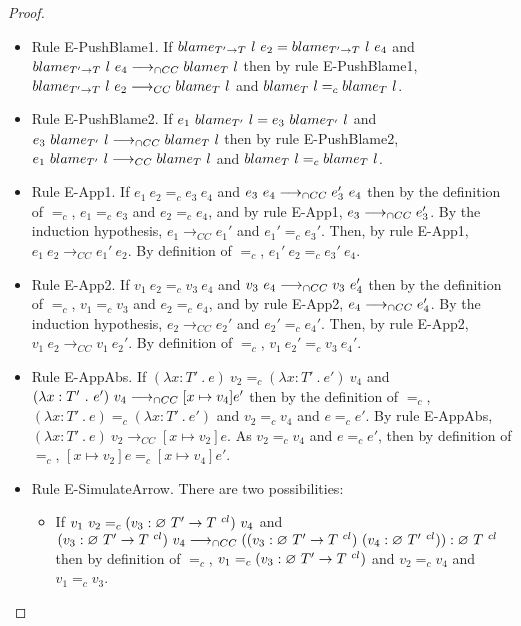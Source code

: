 \documentclass[a4paper]{article}
\begin{document}
\begin{proof}
\begin{itemize}
\begin{itemize}
        \item Rule E-PushBlame1.
        If $blame_{T' \rightarrow T}\ l\ e_2 = blame_{T' \rightarrow T}\ l\ e_4$ and $blame_{T' \rightarrow T}\ l\ e_4 \longrightarrow_{\cap CC} blame_{T}\ l$ then by rule E-PushBlame1, $blame_{T' \rightarrow T}\ l\ e_2 \longrightarrow_{CC} blame_{T}\ l$ and $blame_{T}\ l =_c blame_{T}\ l$.
        \item Rule E-PushBlame2.
        If $e_1\ \blame{T'}{l} = e_3\ \blame{T'}{l}$ and $e_3\ blame_{T'}\ l \longrightarrow_{\cap CC} blame_{T}\ l$ then by rule E-PushBlame2, $e_1\ blame_{T'}\ l \longrightarrow_{CC} blame_{T}\ l$ and $blame_{T}\ l =_c blame_{T}\ l$.
        \item Rule E-App1.
        If $e_1\ e_2 =_c e_3\ e_4$ and $e_3\ e_4 \longrightarrow_{\cap CC} e_3'\ e_4$ then by the definition of $=_c$, $e_1 =_c e_3$ and $e_2 =_c e_4$, and by rule E-App1, $e_3 \longrightarrow_{\cap CC} e_3'$.
        By the induction hypothesis, $e_1 \longrightarrow_{CC} e_1'$ and $e_1' =_c e_3'$.
        Then, by rule E-App1, $e_1\ e_2 \longrightarrow_{CC} e_1'\ e_2$.
        By definition of $=_c$, $e_1'\ e_2 =_c e_3'\ e_4$.
        \item Rule E-App2.
        If $v_1\ e_2 =_c v_3\ e_4$ and $v_3\ e_4 \longrightarrow_{\cap CC} v_3\ e_4'$ then by the definition of $=_c$, $v_1 =_c v_3$ and $e_2 =_c e_4$, and by rule E-App2, $e_4 \longrightarrow_{\cap CC} e_4'$.
        By the induction hypothesis, $e_2 \longrightarrow_{CC} e_2'$ and $e_2' =_c e_4'$.
        Then, by rule E-App2, $v_1\ e_2 \longrightarrow_{CC} v_1\ e_2'$.
        By definition of $=_c$, $v_1\ e_2' =_c v_3\ e_4'$.
        \item Rule E-AppAbs.
        If $(\lambda x : T'\ .\ e)\ v_2 =_c (\lambda x : T'\ .\ e')\ v_4$ and $(\lambda x : T'\ .\ e')\ v_4 \longrightarrow_{\cap CC} [x \mapsto v_4]e'$ then by the definition of $=_c$, $(\lambda x : T'\ .\ e) =_c (\lambda x : T'\ .\ e')$ and $v_2 =_c v_4$ and $e =_c e'$.
        By rule E-AppAbs, $(\lambda x : T'\ .\ e)\ v_2 \longrightarrow_{CC} [x \mapsto v_2]e$.
        As $v_2 =_c v_4$ and $e =_c e'$, then by definition of $=_c$, $[x \mapsto v_2]e =_c [x \mapsto v_4]e'$.
        \item Rule E-SimulateArrow.
        There are two possibilities:
        \begin{itemize}
            \item If $v_1\ v_2 =_c (v_3 : \varnothing\ T' \rightarrow T\ ^{cl})\ v_4$ and $(v_3 : \varnothing\ T' \rightarrow T\ ^{cl})\ v_4 \longrightarrow_{\cap CC} ((v_3 : \varnothing\ T' \rightarrow T\ ^{cl})\ (v_4 : \varnothing\ T'\ ^{cl})) : \varnothing\ T\ ^{cl}$ then by definition of $=_c$, $v_1 =_c (v_3 : \varnothing\ T' \rightarrow T\ ^{cl})$ and $v_2 =_c v_4$ and $v_1 =_c v_3$.

\end{itemize}
\end{itemize}
\end{itemize}
\end{proof}
\end{document}
